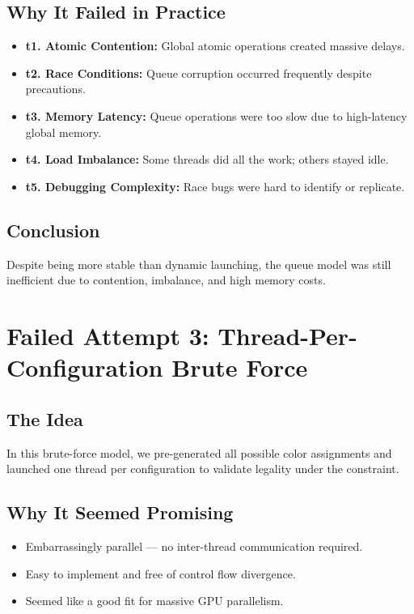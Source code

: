 \documentclass[12pt]{article}
\begin{document}
\subsection{Why It Failed in Practice}
\begin{itemize}
    \item \textbf{t1. Atomic Contention:} Global atomic operations created massive delays.
    \item \textbf{t2. Race Conditions:} Queue corruption occurred frequently despite precautions.
    \item \textbf{t3. Memory Latency:} Queue operations were too slow due to high-latency global memory.
    \item \textbf{t4. Load Imbalance:} Some threads did all the work; others stayed idle.
    \item \textbf{t5. Debugging Complexity:} Race bugs were hard to identify or replicate.
\end{itemize}

\subsection{Conclusion}
Despite being more stable than dynamic launching, the queue model was still inefficient due to contention, imbalance, and high memory costs.

\section{Failed Attempt 3: Thread-Per-Configuration Brute Force}

\subsection{The Idea}
In this brute-force model, we pre-generated all possible color assignments and launched one thread per configuration to validate legality under the constraint.

\subsection{Why It Seemed Promising}
\begin{itemize}
    \item Embarrassingly parallel — no inter-thread communication required.
    \item Easy to implement and free of control flow divergence.
    \item Seemed like a good fit for massive GPU parallelism.
\end{itemize}
\end{document}
